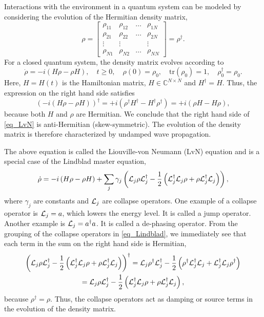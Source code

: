 \documentclass[11pt]{article}
\begin{document}
Interactions with the environment in a quantum system can be modeled
by considering the evolution of the Hermitian density matrix,
\[
\rho =
\begin{bmatrix}
\rho_{11} & \rho_{12} & \ldots & \rho_{1N} \\
\rho_{21} & \rho_{22} & \ldots & \rho_{2N} \\
\vdots    & \vdots    &           & \vdots \\
\rho_{N1} & \rho_{N2} & \ldots & \rho_{NN}
\end{bmatrix}
%
= \rho^\dag.
\]
For a closed quantum system, the density matrix evolves according to
\begin{equation}\label{eq_LvN}
\dot{\rho} = -i\left(H\rho - \rho H\right),\quad t\geq 0, \quad
\rho(0) = \rho_0,\quad \mbox{tr$(\rho_0)$} = 1,\quad \rho_0^\dag = \rho_0.
\end{equation}
Here, $H = H(t)$ is the Hamiltonian matrix, $H\in{\mathbb C}^{N\times N}$ and $H^\dag = H$. Thus,
the expression on the right hand side satisfies
\[
\left( -i\left(H\rho - \rho H\right) \right)^\dag = +i \left( \rho^\dag H^\dag - H^\dag \rho^\dag
\right)
%
= +i \left( \rho H - H \rho \right),
\]
because both $H$ and $\rho$ are Hermitian. We conclude that the right hand side of \eqref{eq_LvN} is
anti-Hermitian (skew-symmetric). The evolution of the density matrix is therefore characterized by undamped wave
propagation.

The above equation is called the Liouville-von Neumann (LvN) equation and is a special case of the
Lindblad master equation,
\begin{equation}\label{eq_Lindblad}
\dot{\rho} = -i\left(H\rho - \rho H\right) + \sum_j \gamma_j\left( {\cal L}_j \rho {\cal L}_j^\dag -
\frac{1}{2}\left( {\cal L}_j^\dag{\cal L}_j\rho + \rho{\cal L}_j^\dag{\cal L}_j \right) \right),
\end{equation}
where $\gamma_j$ are constants and ${\cal L}_j$ are collapse operators. One example of a collapse
operator is ${\cal L}_j = a$, which lowers the energy level. It is called a jump operator. Another
example is ${\cal L}_j = a^\dag a$. It is called a de-phasing operator. From the grouping of the
collapse operators in \eqref{eq_Lindblad}, we immediately see that each term in the sum on the right
hand side is Hermitian,
\begin{multline*}
\left( {\cal L}_j \rho {\cal L}_j^\dag -
\frac{1}{2}\left( {\cal L}_j^\dag{\cal L}_j\rho + \rho{\cal L}_j^\dag{\cal L}_j \right) \right)^\dag
=
%
 {\cal L}_j \rho^\dag {\cal L}_j^\dag -
 \frac{1}{2}\left( \rho^\dag{\cal L}_j^\dag{\cal L}_j + {\cal L}_j^\dag{\cal L}_j\rho^\dag \right) \\
= {\cal L}_j \rho {\cal L}_j^\dag - \frac{1}{2}\left( {\cal L}_j^\dag{\cal L}_j\rho + \rho{\cal L}_j^\dag{\cal L}_j \right),
\end{multline*}
because $\rho^\dag = \rho$. Thus, the collapse operators act as damping or source terms in the
evolution of the density matrix.
\end{document}
